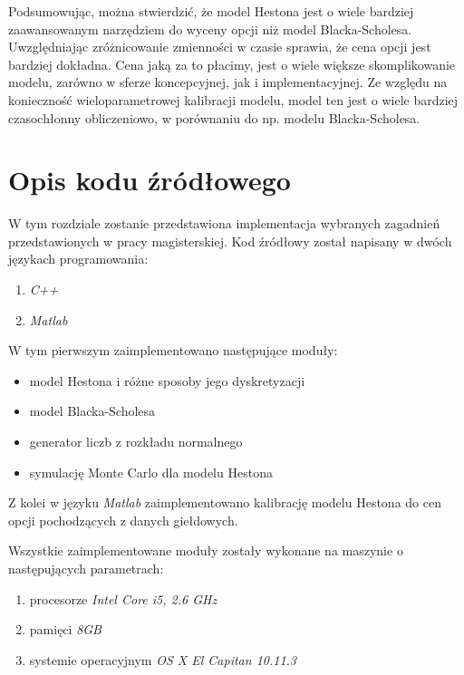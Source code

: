 \documentclass{pracamgr}
\begin{document}
Podsumowując, można stwierdzić, że model Hestona jest o wiele bardziej zaawansowanym
narzędziem do wyceny opcji niż model Blacka-Scholesa. Uwzględniając zróżnicowanie zmienności 
w czasie sprawia, że cena opcji jest bardziej dokładna. Cena jaką za to płacimy,
jest o wiele większe skomplikowanie modelu, zarówno w sferze koncepcyjnej, jak i 
implementacyjnej. Ze względu na konieczność wieloparametrowej kalibracji modelu, 
model ten jest o wiele bardziej czasochłonny obliczeniowo, w porównaniu do np. modelu Blacka-Scholesa.

\cleardoublepage
{}
\appendix

\chapter{Opis kodu źródłowego}

W tym rozdziale zostanie przedstawiona implementacja wybranych zagadnień przedstawionych w 
pracy magisterskiej. Kod źródłowy został napisany w dwóch językach programowania: 
\begin{enumerate}
  \item \textit{C++}
  \item \textit{Matlab}
\end{enumerate}
W tym pierwszym zaimplementowano następujące moduły:
\begin{itemize}
  \item model Hestona i różne sposoby jego dyskretyzacji
  \item model Blacka-Scholesa
  \item generator liczb z rozkładu normalnego
  \item symulację Monte Carlo dla modelu Hestona
\end{itemize}
Z kolei w języku \textit{Matlab} zaimplementowano kalibrację modelu Hestona do cen opcji pochodzących
z danych giełdowych.

Wszystkie zaimplementowane moduły zostały wykonane na maszynie o następujących parametrach:
\begin{enumerate}
  \item procesorze \textit{Intel Core i5, 2.6 GHz}
  \item pamięci \textit{8GB}
  \item systemie operacyjnym \textit{OS X El Capitan 10.11.3}
\end{enumerate}
\end{document}
